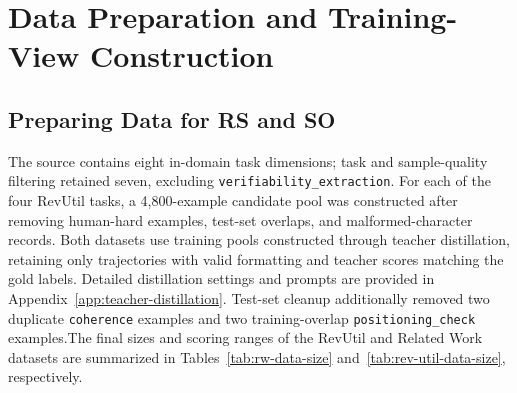 \section{Data Preparation and Training-View Construction}
\label{app:dataset}


\subsection{Preparing Data for RS and SO}


The source contains eight in-domain task dimensions; task and sample-quality
filtering retained seven, excluding \texttt{verifiability\_extraction}. For
each of the four RevUtil tasks, a 4,800-example candidate pool was constructed
after removing human-hard examples, test-set overlaps, and malformed-character
records. Both datasets use training pools constructed through teacher distillation,
retaining only trajectories with valid formatting and teacher scores matching
the gold labels. Detailed distillation settings and prompts are provided in
Appendix~\ref{app:teacher-distillation}. 
Test-set cleanup additionally removed two duplicate
\texttt{coherence} examples and two training-overlap
\texttt{positioning\_check} examples.The final sizes and scoring ranges of the 
RevUtil and Related Work datasets are
summarized in Tables~\ref{tab:rw-data-size} and~\ref{tab:rev-util-data-size},
respectively.


